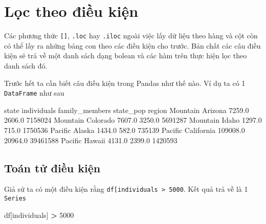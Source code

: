 \documentclass[
]{book}
\newenvironment{Shaded}{\begin{snugshade}}{\end{snugshade}}
\newcommand{\DecValTok}[1]{\textcolor[rgb]{0.00,0.00,0.81}{#1}}
\newcommand{\FloatTok}[1]{\textcolor[rgb]{0.00,0.00,0.81}{#1}}
\newcommand{\NormalTok}[1]{#1}
\newcommand{\OperatorTok}[1]{\textcolor[rgb]{0.81,0.36,0.00}{\textbf{#1}}}
\newcommand{\StringTok}[1]{\textcolor[rgb]{0.31,0.60,0.02}{#1}}
\begin{document}
\section{Lọc theo điều kiện}\label{lux1ecdc-theo-ux111iux1ec1u-kiux1ec7n}

Các phương thức \texttt{{[}{]}}, \texttt{.loc} hay \texttt{.iloc} ngoài việc lấy dữ liệu theo hàng và cột còn có thể lấy ra những bảng con theo các điều kiện cho trước. Bản chất các câu điều kiện sẽ trả về một danh sách dạng bolean và các hàm trên thực hiện lọc theo danh sách đó.

Trước hết ta cần biết câu điều kiện trong Pandas như thế nào. Ví dụ ta có 1 \texttt{DataFrame} như sau

\begin{Shaded}
\begin{Highlighting}[]
\NormalTok{               state  individuals  family\_members  state\_pop}
\NormalTok{region                                                      }
\NormalTok{Mountain     Arizona       }\FloatTok{7259.0}          \FloatTok{2606.0}    \DecValTok{7158024}
\NormalTok{Mountain    Colorado       }\FloatTok{7607.0}          \FloatTok{3250.0}    \DecValTok{5691287}
\NormalTok{Mountain       Idaho       }\FloatTok{1297.0}           \FloatTok{715.0}    \DecValTok{1750536}
\NormalTok{Pacific       Alaska       }\FloatTok{1434.0}           \FloatTok{582.0}     \DecValTok{735139}
\NormalTok{Pacific   California     }\FloatTok{109008.0}         \FloatTok{20964.0}   \DecValTok{39461588}
\NormalTok{Pacific       Hawaii       }\FloatTok{4131.0}          \FloatTok{2399.0}    \DecValTok{1420593}
\end{Highlighting}
\end{Shaded}

\subsection{Toán tử điều kiện}\label{touxe1n-tux1eed-ux111iux1ec1u-kiux1ec7n}

Giả sử ta có một điều kiện rằng \texttt{df{[}\textquotesingle{}individuals\textquotesingle{}{]}\ \textgreater{}\ 5000}. Kết quả trả về là 1 \texttt{Series}

\begin{Shaded}
\begin{Highlighting}[]
\NormalTok{df[}\StringTok{\textquotesingle{}individuals\textquotesingle{}}\NormalTok{] }\OperatorTok{\textgreater{}} \DecValTok{5000}
\end{Highlighting}
\end{Shaded}
\end{document}
